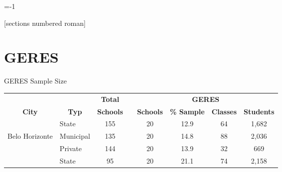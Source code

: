 \documentclass{beamer}
\makeatletter
\newcommand{\setnextsection}[1]{%
  \setcounter{section}{\numexpr#1-1\relax}%
  \beamer@tocsectionnumber=\numexpr#1-1\relax\space}
\makeatother
\begin{document}
\appendix
\setcounter{equation}{0}
\renewcommand\theequation{A.\arabic{equation}}
\setnextsection{1}

[sections numbered roman]






\section{GERES}
\begin{frame}[label=GERESSample]{GERES Sample Size}
\vspace{-27pt} \flushright \hyperlink{Mirror}{\beamerbutton{\textcolor{red}{Mirror}}}
\vspace{-8pt}
\begin{table}[H]
\label{table:SampleSize}                         
  \begin{adjustbox}{max width=\textwidth}
    \begin{tabular}{llllllll}
    \toprule
          &       & \multicolumn{1}{c}{\textbf{Total}} &       & \multicolumn{4}{c}{\textbf{GERES}} \\
\cmidrule{3-3}\cmidrule{5-8}    \multicolumn{1}{c}{\textbf{City}} & \multicolumn{1}{c}{\textbf{Typ}} & \multicolumn{1}{p{4.39em}}{\textbf{ Schools }} &       & \multicolumn{1}{p{5.5em}}{\textbf{ Schools }} & \multicolumn{1}{p{5.5em}}{\textbf{ \% Sample }} & \multicolumn{1}{c}{\textbf{ Classes }} & \multicolumn{1}{c}{\textbf{ Students }} \\
    \midrule
          & State & \multicolumn{1}{c}{155 } &       & \multicolumn{1}{c}{20 } & \multicolumn{1}{c}{12.9} & \multicolumn{1}{c}{64 } & \multicolumn{1}{c}{1,682 } \\
    Belo Horizonte & Municipal & \multicolumn{1}{c}{135 } &       & \multicolumn{1}{c}{20 } & \multicolumn{1}{c}{14.8} & \multicolumn{1}{c}{88 } & \multicolumn{1}{c}{2,036 } \\
          & Private & \multicolumn{1}{c}{144 } &       & \multicolumn{1}{c}{20 } & \multicolumn{1}{c}{13.9} & \multicolumn{1}{c}{32 } & \multicolumn{1}{c}{669 } \vspace{-3pt} \\
    \midrule
          & State & \multicolumn{1}{c}{95 } &       & \multicolumn{1}{c}{20 } & \multicolumn{1}{c}{21.1} & \multicolumn{1}{c}{74 } & \multicolumn{1}{c}{2,158 } \\

\end{tabular}
\end{adjustbox}
\end{table}
\end{frame}
\end{document}
